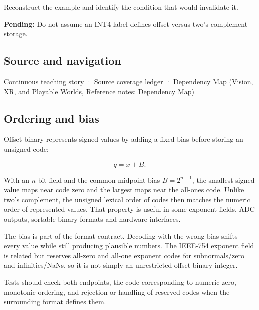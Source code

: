 Reconstruct the example and identify the condition that would invalidate it.

\textbf{Pending:} Do not assume an INT4 label defines offset versus two's-complement storage.

\subsection{Source and navigation}\label{appendix-53a8cfb25f8d-source-and-navigation}

\hyperref[01-foundations-i-ch001-choosing-what-information-to-keep]{Continuous teaching story} · {Source coverage ledger} · \href{../07-Vision-XR-and-Playable-Worlds/main.pdf\#nameddest=appendix-4ad47bdd269a}{Dependency Map (Vision, XR, and Playable Worlds, Reference notes: Dependency Map)}

\subsection{Ordering and bias}\label{appendix-53a8cfb25f8d-ordering-and-bias}

Offset-binary represents signed values by adding a fixed bias before storing an unsigned code:

\[q=x+B.\]

With an \(n\)-bit field and the common midpoint bias \(B=2^{n-1}\), the smallest signed value maps near code zero and the largest maps near the all-ones code. Unlike two's complement, the unsigned lexical order of codes then matches the numeric order of represented values. That property is useful in some exponent fields, ADC outputs, sortable binary formats and hardware interfaces.

The bias is part of the format contract. Decoding with the wrong bias shifts every value while still producing plausible numbers. The IEEE-754 exponent field is related but reserves all-zero and all-one exponent codes for subnormals/zero and infinities/NaNs, so it is not simply an unrestricted offset-binary integer.

Tests should check both endpoints, the code corresponding to numeric zero, monotonic ordering, and rejection or handling of reserved codes when the surrounding format defines them.
